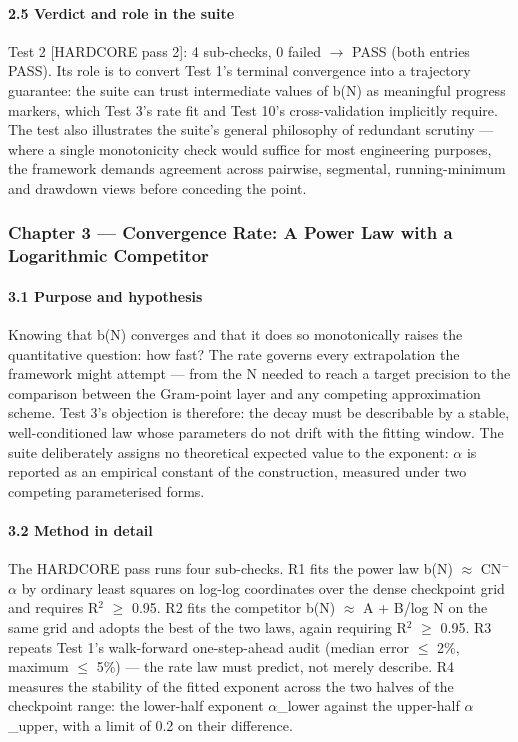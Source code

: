 \documentclass[10pt]{article}
\begin{document}
\paragraph{2.5 Verdict and role in the suite}

Test 2 [HARDCORE pass 2]: 4 sub-checks, 0 failed $\rightarrow$ PASS (both entries PASS). Its role is to convert Test 1's terminal convergence into a trajectory guarantee: the suite can trust intermediate values of b(N) as meaningful progress markers, which Test 3's rate fit and Test 10's cross-validation implicitly require. The test also illustrates the suite's general philosophy of redundant scrutiny --- where a single monotonicity check would suffice for most engineering purposes, the framework demands agreement across pairwise, segmental, running-minimum and drawdown views before conceding the point.

\subsubsection{Chapter 3 --- Convergence Rate: A Power Law with a Logarithmic Competitor}

\paragraph{3.1 Purpose and hypothesis}

Knowing that b(N) converges and that it does so monotonically raises the quantitative question: how fast? The rate governs every extrapolation the framework might attempt --- from the N needed to reach a target precision to the comparison between the Gram-point layer and any competing approximation scheme. Test 3's objection is therefore: the decay must be describable by a stable, well-conditioned law whose parameters do not drift with the fitting window. The suite deliberately assigns no theoretical expected value to the exponent: $\alpha$ is reported as an empirical constant of the construction, measured under two competing parameterised forms.

\paragraph{3.2 Method in detail}

The HARDCORE pass runs four sub-checks. R1 fits the power law b(N) $\approx$ C\textperiodcentered{}N$^-$$\alpha$ by ordinary least squares on log-log coordinates over the dense checkpoint grid and requires R$^2$ $\ge$ 0.95. R2 fits the competitor b(N) $\approx$ A + B/log N on the same grid and adopts the best of the two laws, again requiring R$^2$ $\ge$ 0.95. R3 repeats Test 1's walk-forward one-step-ahead audit (median error $\le$ 2\%, maximum $\le$ 5\%) --- the rate law must predict, not merely describe. R4 measures the stability of the fitted exponent across the two halves of the checkpoint range: the lower-half exponent $\alpha$\_lower against the upper-half $\alpha$\_upper, with a limit of 0.2 on their difference.
\end{document}
